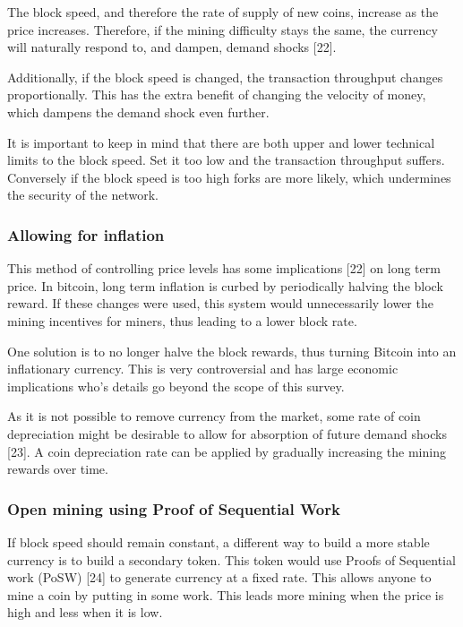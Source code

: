 \documentclass[english,]{IEEEtran}
\begin{document}
The block speed, and therefore the rate of supply of new coins, increase
as the price increases. Therefore, if the mining difficulty stays the
same, the currency will naturally respond to, and dampen, demand shocks
{[}22{]}.

Additionally, if the block speed is changed, the transaction throughput
changes proportionally. This has the extra benefit of changing the
velocity of money, which dampens the demand shock even further.

It is important to keep in mind that there are both upper and lower
technical limits to the block speed. Set it too low and the transaction
throughput suffers. Conversely if the block speed is too high forks are
more likely, which undermines the security of the network.

\subsubsection{Allowing for inflation}\label{allowing-for-inflation}

This method of controlling price levels has some implications {[}22{]}
on long term price. In bitcoin, long term inflation is curbed by
periodically halving the block reward. If these changes were used, this
system would unnecessarily lower the mining incentives for miners, thus
leading to a lower block rate.

One solution is to no longer halve the block rewards, thus turning
Bitcoin into an inflationary currency. This is very controversial and
has large economic implications who's details go beyond the scope of
this survey.

As it is not possible to remove currency from the market, some rate of
coin depreciation might be desirable to allow for absorption of future
demand shocks {[}23{]}. A coin depreciation rate can be applied by
gradually increasing the mining rewards over time.

\subsubsection{Open mining using Proof of Sequential
Work}\label{open-mining-using-proof-of-sequential-work}

If block speed should remain constant, a different way to build a more
stable currency is to build a secondary token. This token would use
Proofs of Sequential work (PoSW) {[}24{]} to generate currency at a
fixed rate. This allows anyone to mine a coin by putting in some work.
This leads more mining when the price is high and less when it is low.
\end{document}
